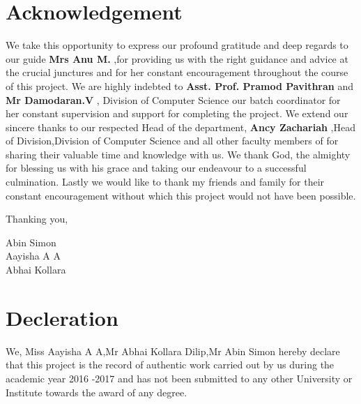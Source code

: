 \documentclass{article}
\begin{document}
\vspace*{\fill}

\newpage


\section{Acknowledgement}
\vspace{1em}

\Large
We take this opportunity to express our profound gratitude and deep regards to our guide \textbf{Mrs Anu M.}
,for providing us with the right guidance and advice at the crucial junctures and for her constant encouragement throughout the course of this project. We are highly indebted to \textbf{Asst. Prof. Pramod Pavithran}
 and \textbf{Mr Damodaran.V}
 , Division of Computer Science our batch coordinator for her constant supervision and support for completing the project. We extend our sincere thanks to our respected Head of the department, \textbf{Ancy Zachariah}
 ,Head of Division,Division of Computer Science and all other faculty members of for sharing their valuable time and knowledge with us. We thank God, the almighty for blessing us with his grace and taking our endeavour to a successful culmination. Lastly we would like to thank my friends and family for their constant encouragement without which this project would not have been possible.

 \begin{flushright}

  \vspace{2em}

 \Large
 Thanking you,\\
 \vspace{1em}

 \Large
 Abin Simon\\
 Aayisha A A\\
 Abhai Kollara\\

 \end{flushright}


\newpage

\section{Decleration}
\vspace{1em}
\Large
We, Miss Aayisha A A,Mr Abhai Kollara Dilip,Mr Abin Simon hereby declare that this project is the record of authentic work carried out by us during the academic year 2016 -2017 and has not been submitted to any other University or Institute towards the award of any degree.
\end{document}
